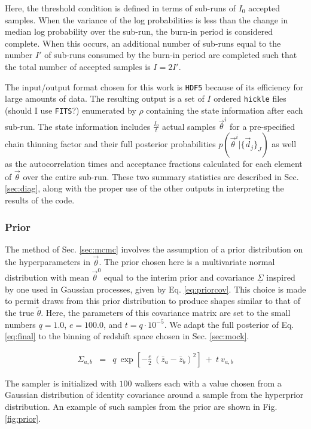 \documentclass[preprint]{aastex}
\newcommand{\textul}{\underline}
\begin{document}
Here, the threshold condition is defined in terms of sub-runs of $I_{0}$ 
accepted samples.  When the variance of the log probabilities is less than the 
change in median log probability over the sub-run, the burn-in period is 
considered complete.  When this occurs, an additional number of sub-runs equal 
to the number $I'$ of sub-runs consumed by the burn-in period are completed 
such that the total number of accepted samples is $I=2I'$.  

The input/output format chosen for this work is \texttt{HDF5} because of its 
efficiency for large amounts of data.  The resulting output is a set of $I$ 
ordered \texttt{hickle} files (should I use \texttt{FITS}?) enumerated by 
$\rho$ containing the state information after each sub-run.  The state 
information includes $\frac{I_{0}}{t}$ actual samples $\vec{\theta}^{i}$ for a 
pre-specified chain thinning factor and their full posterior probabilities 
$p(\vec{\theta}^{i}|\{\vec{d}_{j}\}_{J})$ as well as the autocorrelation times 
and acceptance fractions calculated for each element of $\vec{\theta}$ over the 
entire sub-run.  These two summary statistics are described in Sec. 
\ref{sec:diag}, along with the proper use of the other outputs in interpreting 
the results of the code.

\clearpage
\subsubsection{Prior}
\label{sec:prior}

The method of Sec. \ref{sec:mcmc} involves the assumption of a prior 
distribution on the hyperparameters in $\vec{\theta}$.  The prior chosen here 
is a multivariate normal distribution with mean $\vec{\theta}^{0}$ equal to the 
interim prior and covariance $\textul{\Sigma}$ inspired by one used in Gaussian 
processes, given by Eq. \ref{eq:priorcov}.  This choice is made to permit draws 
from this prior distribution to produce shapes similar to that of the true 
$\tilde{\theta}$.  Here, the parameters of this covariance matrix are set to 
the small numbers $q=1.0$, $e=100.0$, and $t=q\cdot10^{-5}$.  We adapt the full 
posterior of Eq. \ref{eq:final} to the binning of redshift space chosen in Sec. 
\ref{sec:mock}.

\begin{eqnarray}
\label{eq:priorcov}
\Sigma_{a,b} &=& q\ \exp[-\frac{e}{2}\ (\bar{z}_{a}-\bar{z}_{b})^{2}]\ +\ t\ 
v_{a,b}
\end{eqnarray}

The sampler is initialized with $100$ walkers each with a value chosen from a 
Gaussian distribution of identity covariance around a sample from the 
hyperprior distribution.  An example of such samples from the prior are shown 
in Fig. \ref{fig:prior}.
\end{document}

